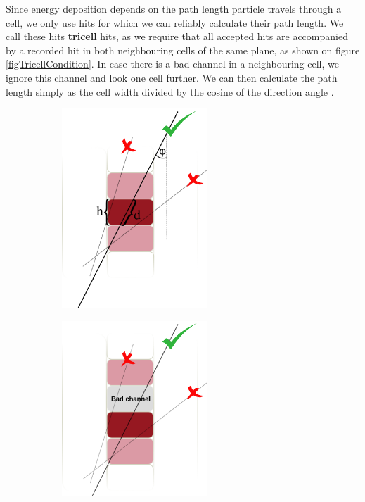 \documentclass[12pt,a4paper]{article}
\begin{document}
Since energy deposition depends on the path length particle travels through a cell, we only use hits for which we can reliably calculate their path length. We call these hits \textbf{tricell} hits, as we require that all accepted hits are accompanied by a recorded hit in both neighbouring cells of the same plane, as shown on figure \ref{figTricellCondition}. In case there is a bad channel in a neighbouring cell, we ignore this channel and look one cell further. We can then calculate the path length simply as the cell width divided by the cosine of the direction angle \cite{NOVA-doc-13579,NOVA-doc-7410}.

\begin{figure}[hbtp]
\centering
\begin{subfigure}[b]{0.49\textwidth}
\centering
\includegraphics[width=0.6\textwidth]{Plots/TricellConditionWithDescription.png}
\caption{}
\end{subfigure}
\begin{subfigure}[b]{0.49\textwidth}
\centering
\includegraphics[width=0.6\textwidth]{Plots/TricellConditionWithBadChannel.png}

\end{subfigure}
\end{figure}
\end{document}
